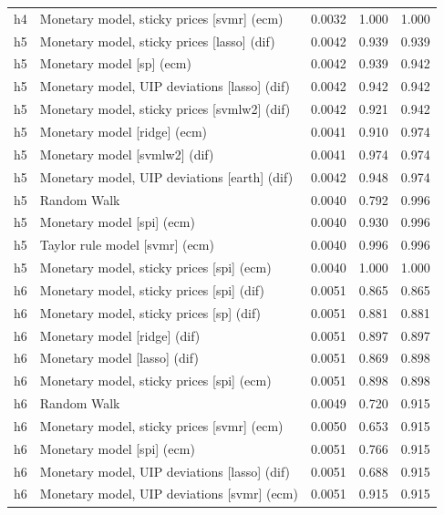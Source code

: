\begin{ThreePartTable}
\begin{longtable}[t]{cp{5.5cm}ccc}
h4 & \raggedright Monetary model, sticky prices [svmr] (ecm) & 0.0032 & 1.000 & 1.000\\
\addlinespace
h5 & \raggedright Monetary model, sticky prices [lasso] (dif) & 0.0042 & 0.939 & 0.939\\
h5 & \raggedright Monetary model [sp] (ecm) & 0.0042 & 0.939 & 0.942\\
h5 & \raggedright Monetary model, UIP deviations [lasso] (dif) & 0.0042 & 0.942 & 0.942\\
h5 & \raggedright Monetary model, sticky prices [svmlw2] (dif) & 0.0042 & 0.921 & 0.942\\
h5 & \raggedright Monetary model [ridge] (ecm) & 0.0041 & 0.910 & 0.974\\
h5 & \raggedright Monetary model [svmlw2] (dif) & 0.0041 & 0.974 & 0.974\\
h5 & \raggedright Monetary model, UIP deviations [earth] (dif) & 0.0042 & 0.948 & 0.974\\
h5 & \raggedright Random Walk & 0.0040 & 0.792 & 0.996\\
h5 & \raggedright Monetary model [spi] (ecm) & 0.0040 & 0.930 & 0.996\\
h5 & \raggedright Taylor rule model [svmr] (ecm) & 0.0040 & 0.996 & 0.996\\
h5 & \raggedright Monetary model, sticky prices [spi] (ecm) & 0.0040 & 1.000 & 1.000\\
\addlinespace
h6 & \raggedright Monetary model, sticky prices [spi] (dif) & 0.0051 & 0.865 & 0.865\\
h6 & \raggedright Monetary model, sticky prices [sp] (dif) & 0.0051 & 0.881 & 0.881\\
h6 & \raggedright Monetary model [ridge] (dif) & 0.0051 & 0.897 & 0.897\\
h6 & \raggedright Monetary model [lasso] (dif) & 0.0051 & 0.869 & 0.898\\
h6 & \raggedright Monetary model, sticky prices [spi] (ecm) & 0.0051 & 0.898 & 0.898\\
h6 & \raggedright Random Walk & 0.0049 & 0.720 & 0.915\\
h6 & \raggedright Monetary model, sticky prices [svmr] (ecm) & 0.0050 & 0.653 & 0.915\\
h6 & \raggedright Monetary model [spi] (ecm) & 0.0051 & 0.766 & 0.915\\
h6 & \raggedright Monetary model, UIP deviations [lasso] (dif) & 0.0051 & 0.688 & 0.915\\
h6 & \raggedright Monetary model, UIP deviations [svmr] (ecm) & 0.0051 & 0.915 & 0.915\\

\end{longtable}
\end{ThreePartTable}
